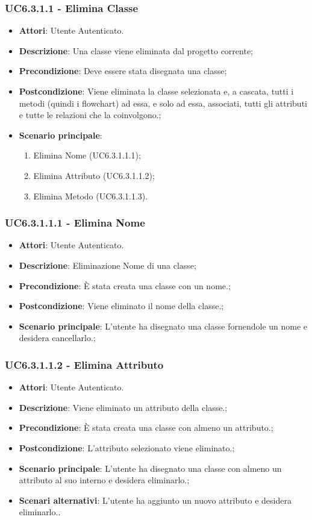 \subsubsection{UC6.3.1.1 - Elimina Classe} 
\label{sssec:UC6.3.1.1} 
\begin{itemize} 
\item \textbf{Attori}: Utente Autenticato.
\item \textbf{Descrizione}: Una classe viene eliminata dal progetto corrente;
\item \textbf{Precondizione}: Deve essere stata disegnata una classe;
\item \textbf{Postcondizione}: Viene eliminata la classe selezionata e, a cascata, tutti i metodi (quindi i flowchart) ad essa, e solo ad essa, associati, tutti gli attributi e tutte le relazioni che la coinvolgono.;
\item \textbf{Scenario principale}: \begin{enumerate}\item Elimina Nome (UC6.3.1.1.1);\item Elimina Attributo (UC6.3.1.1.2);\item Elimina Metodo (UC6.3.1.1.3). 
 \end{enumerate}
\end{itemize} 
\subsubsection{UC6.3.1.1.1 - Elimina Nome} 
\label{sssec:UC6.3.1.1.1} 
\begin{itemize} 
\item \textbf{Attori}: Utente Autenticato.
\item \textbf{Descrizione}: Eliminazione Nome di una classe;
\item \textbf{Precondizione}: È stata creata una classe con un nome.;
\item \textbf{Postcondizione}: Viene eliminato il nome della classe.;
\item \textbf{Scenario principale}: L'utente ha disegnato una classe fornendole un nome e desidera cancellarlo.;\end{itemize} 
\subsubsection{UC6.3.1.1.2 - Elimina Attributo} 
\label{sssec:UC6.3.1.1.2} 
\begin{itemize} 
\item \textbf{Attori}: Utente Autenticato.
\item \textbf{Descrizione}: Viene eliminato un attributo della classe.;
\item \textbf{Precondizione}: È stata creata una classe con almeno un attributo.;
\item \textbf{Postcondizione}: L'attributo selezionato viene eliminato.;
\item \textbf{Scenario principale}: L'utente ha disegnato una classe con almeno un attributo al suo interno e desidera eliminarlo.;\item \textbf{Scenari alternativi}: L'utente ha aggiunto un nuovo attributo e desidera eliminarlo..
\end{itemize} 
